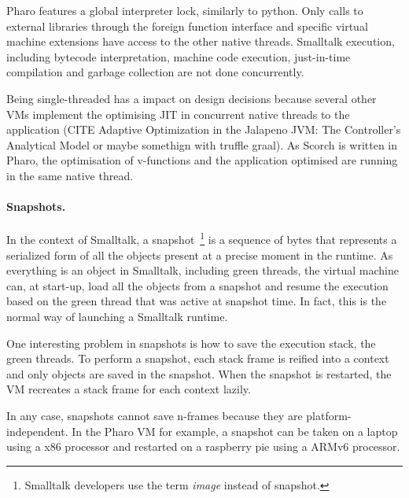 \documentclass[a4paper,12pt,twoside]{../includes/ThesisStyle}
\begin{document}
Pharo features a global interpreter lock, similarly to python. Only calls to external libraries through the foreign function interface and specific virtual machine extensions have access to the other native threads. Smalltalk execution, including bytecode interpretation, machine code execution, just-in-time compilation and garbage collection are not done concurrently. 

Being single-threaded has a impact on design decisions because several other VMs implement the optimising JIT in concurrent native threads to the application (CITE Adaptive Optimization in the Jalapeno JVM: The Controller's Analytical Model or maybe somethign with truffle graal). As Scorch is written in Pharo, the optimisation of v-functions and the application optimised are running in the same native thread.


\paragraph{Snapshots.}

In the context of Smalltalk, a snapshot~\footnote{Smalltalk developers use the term \emph{image} instead of snapshot.} is a sequence of bytes that represents a serialized form of all the objects present at a precise moment in the runtime. As everything is an object in Smalltalk, including green threads, the virtual machine can, at start-up, load all the objects from a snapshot and resume the execution based on the green thread that was active at snapshot time. In fact, this is the normal way of launching a Smalltalk runtime. 

One interesting problem in snapshots is how to save the execution stack, \ie the green threads. To perform a snapshot, each stack frame is reified into a context and only objects are saved in the snapshot. When the snapshot is restarted, the VM recreates a stack frame for each context lazily. 

In any case, snapshots cannot save n-frames because they are platform-independent. In the Pharo VM for example, a snapshot can be taken on a laptop using a x86 processor and restarted on a raspberry pie using a ARMv6 processor.




\ifx\wholebook\relax\else
    
\end{document}
